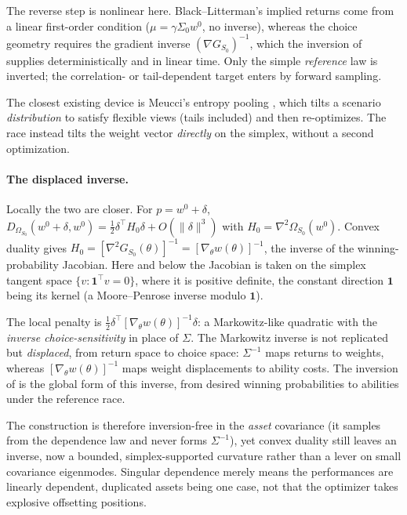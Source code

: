 The reverse step is nonlinear here. Black--Litterman's implied returns come from a linear first-order
condition ($\mu = \gamma\Sigma_0 w^0$, no inverse), whereas the choice geometry
requires the gradient inverse $(\nabla G_{S_0})^{-1}$, which the
inversion of \textcite{cotton2026inversion} supplies deterministically and in
linear time.
Only the simple \emph{reference} law is inverted; the correlation- or
tail-dependent target enters by forward sampling.

The closest existing device is
Meucci's entropy pooling \parencite{meucci2008}, which tilts a scenario
\emph{distribution} to satisfy flexible views (tails included) and then
re-optimizes.
The race instead tilts the weight vector \emph{directly} on the
simplex, without a second optimization.

\paragraph{The displaced inverse.}
Locally the two are closer.
For $p = w^0 + \delta$,
$D_{\Omega_{S_0}}(w^0+\delta, w^0) = \tfrac12\delta^\top H_0\delta + O(\|\delta\|^3)$
with $H_0 = \nabla^2\Omega_{S_0}(w^0)$.
Convex duality gives
$H_0 = [\nabla^2 G_{S_0}(\theta)]^{-1} = [\nabla_\theta w(\theta)]^{-1}$, the inverse
of the winning-probability Jacobian.
Here and below the Jacobian is taken on the
simplex tangent space $\{v:\mathbf 1^\top v=0\}$, where it is positive definite, the
constant direction $\mathbf 1$ being its kernel (a Moore--Penrose inverse modulo
$\mathbf 1$).

The local penalty is
$\tfrac12\delta^\top[\nabla_\theta w(\theta)]^{-1}\delta$: a Markowitz-like
quadratic with the \emph{inverse choice-sensitivity} in place of $\Sigma$.
The
Markowitz inverse is not replicated but \emph{displaced}, from return space to
choice space: $\Sigma^{-1}$ maps returns to weights, whereas
$[\nabla_\theta w(\theta)]^{-1}$ maps weight displacements to ability costs.
The inversion of \textcite{cotton2026inversion} is the global form of this
inverse, from desired winning
probabilities to abilities under the reference race.

The construction is therefore
inversion-free in the \emph{asset} covariance (it samples from the dependence law
and never forms $\Sigma^{-1}$), yet convex duality still leaves an inverse, now a
bounded, simplex-supported curvature rather than a lever on small covariance
eigenmodes.
Singular dependence merely means the performances are linearly dependent,
duplicated assets being one case, not that the optimizer takes explosive
offsetting positions.

